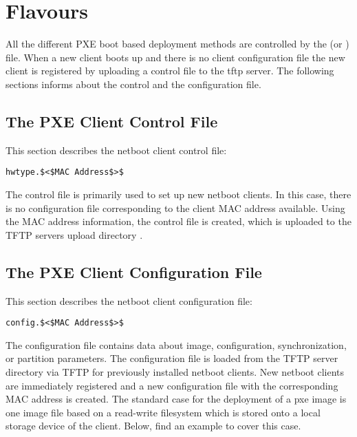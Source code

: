 \section{Flavours}

All the different PXE boot based deployment methods are controlled
by the  (or ) file. When a new client
boots up and there is no client configuration file the new client
is registered by uploading a control file to the tftp server.
The following sections informs about the control and the configuration
file.

\subsection{The PXE Client Control File}
\label{section:cntrlhw}
This section describes the netboot client control file:

\begin{verbatim}
hwtype.$<$MAC Address$>$
\end{verbatim}

The control file is primarily used to set up new netboot clients. In this
case, there is no configuration file corresponding to the client
MAC address available. Using the MAC address information, the control file
is created, which is uploaded to the TFTP servers upload directory
.

\subsection{The PXE Client Configuration File}
\label{section:confmac}
This section describes the netboot client configuration file:

\begin{verbatim}
config.$<$MAC Address$>$
\end{verbatim}

The configuration file contains data about image, configuration,
synchronization, or partition parameters. The configuration file is
loaded from the TFTP server directory  via TFTP
for previously installed netboot clients. New netboot clients are
immediately registered and a new configuration file with the
corresponding MAC address is created. The standard case for the
deployment of a pxe image is one image file based on a read-write
filesystem which is stored onto a local storage device of the client.
Below, find an example to cover this case.

